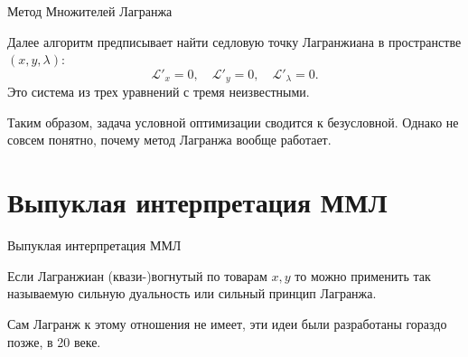 \documentclass{beamer}
\begin{document}
\begin{frame}{Метод Множителей Лагранжа}

Далее алгоритм предписывает найти седловую точку Лагранжиана в пространстве $(x, y, \lambda)$:
$$ \mathcal{L}'_x = 0, \quad \mathcal{L}'_y = 0, \quad \mathcal{L}'_{\lambda} = 0.$$
Это система из трех уравнений с тремя неизвестными.

Таким образом, задача условной оптимизации сводится к безусловной. Однако не совсем понятно, почему метод Лагранжа вообще работает.

\end{frame}

\section{Выпуклая интерпретация ММЛ}

\begin{frame}{Выпуклая интерпретация ММЛ}

Если Лагранжиан (квази-)вогнутый по товарам $x,y$ то можно применить  так называемую \alert{сильную дуальность} или \alert{сильный принцип Лагранжа}.

Сам Лагранж к этому отношения не имеет, эти идеи были разработаны гораздо позже, в 20 веке.
\end{frame}
\end{document}
